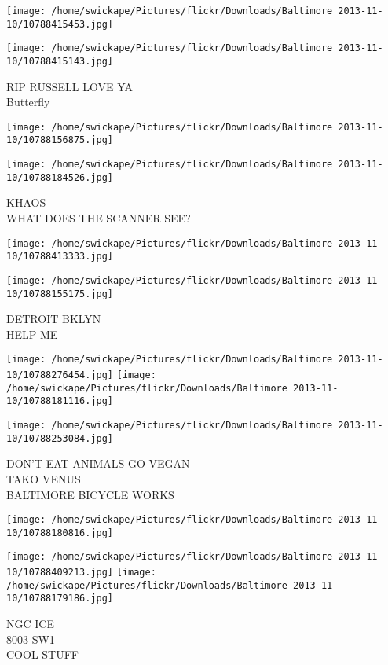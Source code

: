\documentclass[10pt,letterpaper]{article}
\begin{document}
\texttt{[image: /home/swickape/Pictures/flickr/Downloads/Baltimore 2013-11-10/10788415453.jpg]}

\vspace{0.25in}
\texttt{[image: /home/swickape/Pictures/flickr/Downloads/Baltimore 2013-11-10/10788415143.jpg]}

RIP RUSSELL LOVE YA\\
Butterfly
\pagebreak

\texttt{[image: /home/swickape/Pictures/flickr/Downloads/Baltimore 2013-11-10/10788156875.jpg]}

\vspace{0.25in}
\texttt{[image: /home/swickape/Pictures/flickr/Downloads/Baltimore 2013-11-10/10788184526.jpg]}

KHAOS\\
WHAT DOES THE SCANNER SEE?
\pagebreak

\texttt{[image: /home/swickape/Pictures/flickr/Downloads/Baltimore 2013-11-10/10788413333.jpg]}

\vspace{0.25in}
\texttt{[image: /home/swickape/Pictures/flickr/Downloads/Baltimore 2013-11-10/10788155175.jpg]}

DETROIT BKLYN\\
HELP ME
\pagebreak

\texttt{[image: /home/swickape/Pictures/flickr/Downloads/Baltimore 2013-11-10/10788276454.jpg]}
\texttt{[image: /home/swickape/Pictures/flickr/Downloads/Baltimore 2013-11-10/10788181116.jpg]}

\texttt{[image: /home/swickape/Pictures/flickr/Downloads/Baltimore 2013-11-10/10788253084.jpg]}

DON'T EAT ANIMALS GO VEGAN\\
TAKO VENUS\\
BALTIMORE BICYCLE WORKS
\pagebreak

\texttt{[image: /home/swickape/Pictures/flickr/Downloads/Baltimore 2013-11-10/10788180816.jpg]}

\vspace{0.25in}
\texttt{[image: /home/swickape/Pictures/flickr/Downloads/Baltimore 2013-11-10/10788409213.jpg]}
\texttt{[image: /home/swickape/Pictures/flickr/Downloads/Baltimore 2013-11-10/10788179186.jpg]}

NGC ICE\\
8003 SW1\\
COOL STUFF
\pagebreak
\end{document}
